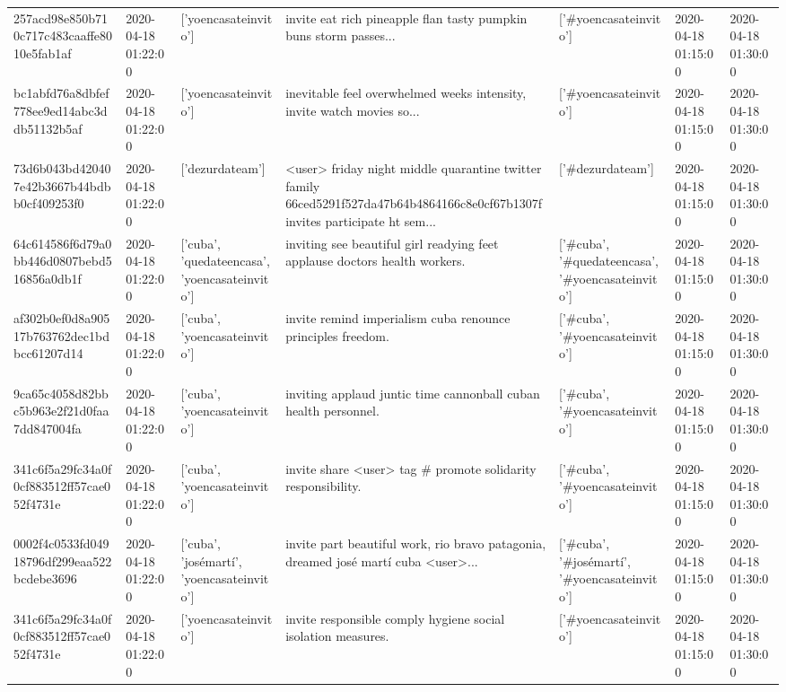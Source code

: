\begin{tabular}{lllllll}
257acd98e850b710c717c483caaffe8010e5fab1af & 2020-04-18 01:22:00 & ['yoencasateinvito'] & invite eat rich pineapple flan tasty pumpkin buns storm passes... & ['#yoencasateinvito'] & 2020-04-18 01:15:00 & 2020-04-18 01:30:00 \\
bc1abfd76a8dbfef778ee9ed14abc3ddb51132b5af & 2020-04-18 01:22:00 & ['yoencasateinvito'] & inevitable feel overwhelmed weeks intensity, invite watch movies so... & ['#yoencasateinvito'] & 2020-04-18 01:15:00 & 2020-04-18 01:30:00 \\
73d6b043bd420407e42b3667b44bdbb0cf409253f0 & 2020-04-18 01:22:00 & ['dezurdateam'] & <user> friday night middle quarantine twitter family 66ced5291f527da47b64b4864166c8e0cf67b1307f invites participate ht sem... & ['#dezurdateam'] & 2020-04-18 01:15:00 & 2020-04-18 01:30:00 \\
64c614586f6d79a0bb446d0807bebd516856a0db1f & 2020-04-18 01:22:00 & ['cuba', 'quedateencasa', 'yoencasateinvito'] & inviting see beautiful girl readying feet applause doctors health workers. & ['#cuba', '#quedateencasa', '#yoencasateinvito'] & 2020-04-18 01:15:00 & 2020-04-18 01:30:00 \\
af302b0ef0d8a90517b763762dec1bdbcc61207d14 & 2020-04-18 01:22:00 & ['cuba', 'yoencasateinvito'] & invite remind imperialism cuba renounce principles freedom. & ['#cuba', '#yoencasateinvito'] & 2020-04-18 01:15:00 & 2020-04-18 01:30:00 \\
9ca65c4058d82bbc5b963e2f21d0faa7dd847004fa & 2020-04-18 01:22:00 & ['cuba', 'yoencasateinvito'] & inviting applaud juntic time cannonball cuban health personnel. & ['#cuba', '#yoencasateinvito'] & 2020-04-18 01:15:00 & 2020-04-18 01:30:00 \\
341c6f5a29fc34a0f0cf883512ff57cae052f4731e & 2020-04-18 01:22:00 & ['cuba', 'yoencasateinvito'] & invite share <user> tag \# promote solidarity responsibility. & ['#cuba', '#yoencasateinvito'] & 2020-04-18 01:15:00 & 2020-04-18 01:30:00 \\
0002f4c0533fd04918796df299eaa522bcdebe3696 & 2020-04-18 01:22:00 & ['cuba', 'josémartí', 'yoencasateinvito'] & invite part beautiful work, rio bravo patagonia, dreamed josé martí cuba <user>... & ['#cuba', '#josémartí', '#yoencasateinvito'] & 2020-04-18 01:15:00 & 2020-04-18 01:30:00 \\
341c6f5a29fc34a0f0cf883512ff57cae052f4731e & 2020-04-18 01:22:00 & ['yoencasateinvito'] & invite responsible comply hygiene social isolation measures. & ['#yoencasateinvito'] & 2020-04-18 01:15:00 & 2020-04-18 01:30:00 \\

\end{tabular}
